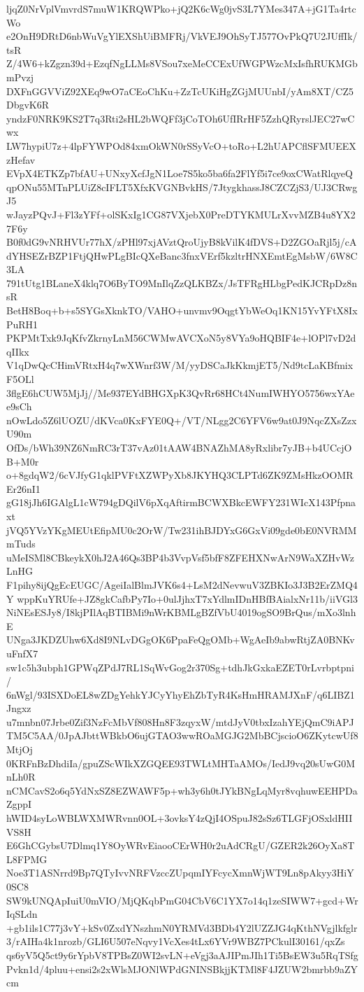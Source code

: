 ljqZ0NrVplVmvrdS7muW1KRQWPko+jQ2K6cWg0jvS3L7YMes347A+jG1Ta4rtcWo
e2OnH9DRtD6nbWuVgYlEXShUiBMFRj/VkVEJ9OhSyTJ577OvPkQ7U2JUffIk/tsR
Z/4W6+kZgzn39d+EzqfNgLLMs8VSou7xeMeCCExUfWGPWzcMxIsfhRUKMGbmPvzj
DXFnGGVViZ92XEq9wO7aCEoChKu+ZzTcUKiHgZGjMUUnbI/yAm8XT/CZ5DbgvK6R
yndzF0NRK9KS2T7q3Rti2sHL2bWQFf3jCoTOh6UfIRrHF5ZzhQRyrslJEC27wCwx
LW7hypiU7z+4lpFYWPOd84xmOkWN0rSSyVcO+toRo+L2hUAPCflSFMUEEXzHefav
EVpX4ETKZp7bfAU+UNxyXcfJgN1Loe7S5ko5ba6fa2FlYf5i7ce9oxCWatRlqyeQ
qpONu55MTnPLUiZ8cIFLT5XfxKVGNBvkHS/7JtygkhassJ8CZCZjS3/UJ3CRwgJ5
wJayzPQvJ+Fl3zYFf+olSKxIg1CG87VXjebX0PreDTYKMULrXvvMZB4u8YX27F6y
B0f0dG9vNRHVUr77hX/zPHl97xjAVztQroUjyB8kVilK4fDVS+D2ZGOaRjl5j/cA
dYHSEZrBZP1FtjQHwPLgBIcQXeBanc3fnxVErf5kzltrHNXEmtEgMsbW/6W8C3LA
791tUtg1BLaneX4klq7O6ByTO9MnIlqZzQLKBZx/JsTFRgHLbgPedKJCRpDz8nsR
BetH8Boq+b+s5SYGsXknkTO/VAHO+unvmv9OqgtYbWeOq1KN15YvYFtX8IxPuRH1
PKPMtTxk9JqKfvZkrnyLnM56CWMwAVCXoN5y8VYa9oHQBIF4e+lOPl7vD2dqIIkx
V1qDwQcCHimVRtxH4q7wXWnrf3W/M/yyDSCaJkKkmjET5/Nd9tcLaKBfmixF5OLl
3flgE6hCUW5MjJj//Me937EYdBHGXpK3QvRr68HCt4NumIWHYO5756wxYAee9sCh
nOwLdo5Z6lUOZU/dKVca0KxFYE0Q+/VT/NLgg2C6YFV6w9at0J9NqcZXsZzxU90m
OfDs/bWh39NZ6NmRC3rT37vAz01tAAW4BNAZhMA8yRxlibr7yJB+b4UCcjOB+M0r
o+8gdqW2/6cVJfyG1qklPVFtXZWPyXb8JKYHQ3CLPTd6ZK9ZMsHkzOOMREr26nI1
gG18jJh6IGAlgL1cW794gDQilV6pXqAftirmBCWXBkcEWFY231WIcX143Pfpnaxt
jVQ5YVzYKgMEUtEfipMU0c2OrW/Tw231ihBJDYxG6GxVi09gde0bE0NVRMMmTuds
uMeISMl8CBkeykX0hJ2A46Qs3BP4b3VvpVsf5bfF8ZFEHXNwArN9WaXZHvWzLnHG
F1pihy8ijQgEcEUGC/AgeiIalBlmJVK6s4+LsM2dNevwuV3ZBKIo3J3B2ErZMQ4Y
wppKuYRUfe+JZ8gkCafbPy7Io+0ulJjhxT7xYdlmIDnHBfBAialxNr11b/iiVGl3
NiNEsESJy8/I8kjPIlAqBTIBMi9nWrKBMLgBZfVbU4019ogSO9BrQus/mXo3lnhE
UNga3JKDZUhw6Xd8I9NLvDGgOK6PpaFeQgOMb+WgAeIb9abwRtjZA0BNKvuFnfX7
sw1c5h3ubph1GPWqZPdJ7RL1SqWvGog2r370Sg+tdhJkGxkaEZET0rLvrbptpni/
6nWgl/93ISXDoEL8wZDgYehkYJCyYhyEhZbTyR4KsHmHRAMJXnF/q6LIBZ1Jngxz
u7mnbn07Jrbe0Zif3NzFcMbVf808Hn8F3zqyxW/mtdJyV0tbxIzahYEjQmC9iAPJ
TM5C5AA/0JpAJbttWBkbO6ujGTAO3wwROaMGJG2MbBCjscioO6ZKytcwUf8MtjOj
0KRFnBzDhdiIa/gpuZScWIkXZGQEE93TWLtMHTaAMOs/IedJ9vq20sUwG0MnLh0R
nCMCavS2o6q5YdNxSZ8EZWAWF5p+wh3y6h0tJYkBNgLqMyr8vqhuwEEHPDaZgppI
hWID4syLoWBLWXMWRvnn0OL+3ovksY4zQjI4OSpuJ82sSz6TLGFjOSxldHIIVS8H
E6GhCGybsU7Dlmq1Y8OyWRvEiaooCErWH0r2uAdCRgU/GZER2k26OyXa8TL8FPMG
Noe3T1ASNrrd9Bp7QTyIvvNRFVzccZUpqmIYFcycXmnWjWT9Ln8pAkyy3HiY0SC8
SW9kUNQApIuiU0mVIO/MjQKqbPmG04CbV6C1YX7o14q1zeSIWW7+gcd+WrIqSLdn
+gb1ils1C77j3vY+kSv0ZxdYNszhmN0YRMVd3BDb4Y2lUZZJG4qKthNVgjlkfglr
3/rAIHa4k1nrozb/GLI6U507eNqvy1VcXes4tLx6YVr9WBZ7PCkulI30161/qxZs
qs6yV5Q5ct9y6rYpbV8TPBsZ0WI2svLN+eVgj3aAJIPmJIh1Ti5BsEW3u5RqTSfg
Pvkn1d/4pluu+ensi2s2xWlsMJONlWPdGNINSBkjjKTMl8F4JZUW2bmrbb9aZYcm
